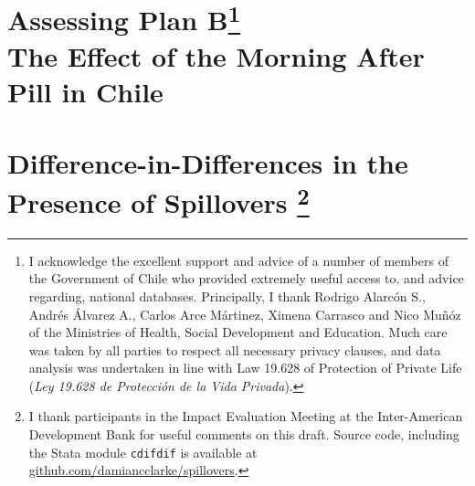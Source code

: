 \documentclass{report}[12pt]
\newcommand{\twinloc}{./twins}
\newcommand{\pillloc}{./planB}
\newcommand{\sdidloc}{./spillovers}
\let\stdsection\thesection
\let\oldchapter\chapter
\renewcommand{\chapter}{\let\thesection\stdsection\oldchapter}
\begin{document}
\begin{spacing}{1.4}



\setlength\parindent{0.25in}
\setlength\parskip{0.25in}
\renewcommand*{\thefootnote}{\fnsymbol{footnote}}

\chapter[Assessing Plan B: The Effect of the Morning After Pill in Chile]{Assessing 
Plan B\footnote{I acknowledge
the excellent support and advice of a number of members of the Government of Chile 
who provided extremely useful access to, and advice regarding, national databases.  
Principally, I thank Rodrigo Alarc\'on S., Andr\'es \'Alvarez A., Carlos Arce 
M\'artinez, Ximena Carrasco and Nico Mu\~n\'oz of the Ministries of Health, Social 
Development and Education.  Much care was taken by all parties to respect all 
necessary privacy clauses, and data analysis was undertaken in line with Law 
19.628 of Protection of Private Life 
(\emph{Ley 19.628 de Protecci\'on de la Vida Privada}).} 
\\[2ex]\Large  The Effect of the Morning After Pill in Chile}
\label{chap:pill}
\renewcommand*{\thefootnote}{\arabic{footnote}}




\setlength\parindent{0.25in}
\setlength\parskip{0.25in}
\renewcommand*{\thefootnote}{\fnsymbol{footnote}}
\chapter[Difference-in-Differences in the Presence of Spillovers]%
{Difference-in-Differences in the Presence of Spillovers%
\footnote{I thank participants in the Impact Evaluation Meeting at the 
Inter-American Development Bank for useful comments on this draft. Source code, 
including the Stata module \texttt{cdifdif} is available at 
\url{github.com/damiancclarke/spillovers}.}}
\label{chap:spill}
\renewcommand*{\thefootnote}{\arabic{footnote}}





\end{spacing}
\newpage

\end{document}
